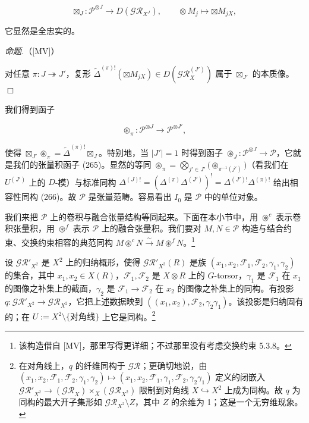\begin{equation}\tag{267}
\boxtimes_J:\mathcal{P}^{\otimes J}\to D(\mathcal{GR}_{X^{J}}),\qquad \otimes M_j\mapsto\boxtimes M_{jX},
\end{equation}

它显然是全忠实的。

 \emph{命题.}（[MV]）

对任意 $\pi:J\twoheadrightarrow J'$，复形 $\tilde\Delta^{(\pi)!}(\boxtimes M_{jX})\in D(\mathcal{GR}_X^{(J')})$ 属于 $\boxtimes_{J'}$ 的本质像。\hfill$\Box$

 我们得到函子

\begin{equation}\tag{268}
\circledast_\pi:\mathcal{P}^{\otimes J}\to\mathcal{P}^{\otimes J'},
\end{equation}

使得 $\boxtimes_{J'}\circledast_\pi=\tilde\Delta^{(\pi)!}\boxtimes_J$。特别地，当 $|J'|=1$ 时得到函子 $\circledast_J:\mathcal{P}^{\otimes J}\to\mathcal{P}$，它就是我们的张量积函子 (265)。显然的等同 $\circledast_\pi=\bigotimes_{j'\in J'}\bigl(\circledast_{\pi^{-1}(j')}\bigr)$（看我们在 $U^{(J')}$ 上的 $D$-模）与标准同构 $\Delta^{(J)!}=(\Delta^{(\pi)}\Delta^{(J')})^{!}=\Delta^{(J')!}\Delta^{(\pi)!}$ 给出相容性同构 (266)。故 $\mathcal{P}$ 是张量范畴。容易看出 $I_0$ 是 $\mathcal{P}$ 中的单位对象。

 我们来把 $\mathcal{P}$ 上的卷积与融合张量结构等同起来。下面在本小节中，用 $\circledast^{c}$ 表示卷积张量积，用 $\circledast^{f}$ 表示 $\mathcal{P}$ 上的融合张量积。我们要对 $M,N\in\mathcal{P}$ 构造与结合约束、交换约束相容的典范同构 $M\circledast^{c}N\xrightarrow{\sim}M\circledast^{f}N$。\footnote{该构造借自 [MV]，那里写得更详细；不过那里没有考虑交换约束 5.3.8。}

设 $\mathcal{GR}'_{X^{2}}$ 是 $X^{2}$ 上的归纳概形，使得 $\mathcal{GR}'_{X^{2}}(R)$ 是族 $(x_1,x_2,\mathcal{F}_1,\mathcal{F}_2,\gamma_1,\gamma_2)$ 的集合，其中 $x_1,x_2\in X(R)$，$\mathcal{F}_1,\mathcal{F}_2$ 是 $X\otimes R$ 上的 $G$-torsor，$\gamma_1$ 是 $\mathcal{F}_1$ 在 $x_1$ 的图像之补集上的截面，$\gamma_2$ 是 $\mathcal{F}_1\to\mathcal{F}_2$ 在 $x_2$ 的图像之补集上的同构。有投影 $q:\mathcal{GR}'_{X^{2}}\to\mathcal{GR}_{X^{2}}$，它把上述数据映到 $((x_1,x_2),\mathcal{F}_2,\gamma_2\gamma_1)$。该投影是归纳固有的；在 $U:=X^{2}\setminus\{\text{对角线}\}$ 上它是同构。\footnote{在对角线上，$q$ 的纤维同构于 $\mathcal{GR}$；更确切地说，由 $(x_1,x_2,\mathcal{F}_1,\mathcal{F}_2,\gamma_1,\gamma_2)\mapsto(x_1,x_2,\mathcal{F}_1,\gamma_1,\mathcal{F}_2,\gamma_2\gamma_1)$ 定义的闭嵌入 $\mathcal{GR}'_{X^{2}}\to(\mathcal{GR}_X)\times_X(\mathcal{GR}_{X^{2}})$ 限制到对角线 $X\hookrightarrow X^{2}$ 上成为同构。故 $q$ 为同构的最大开子集形如 $\mathcal{GR}_{X^{2}}\setminus Z$，其中 $Z$ 的余维为 1；这是一个无穷维现象。}

